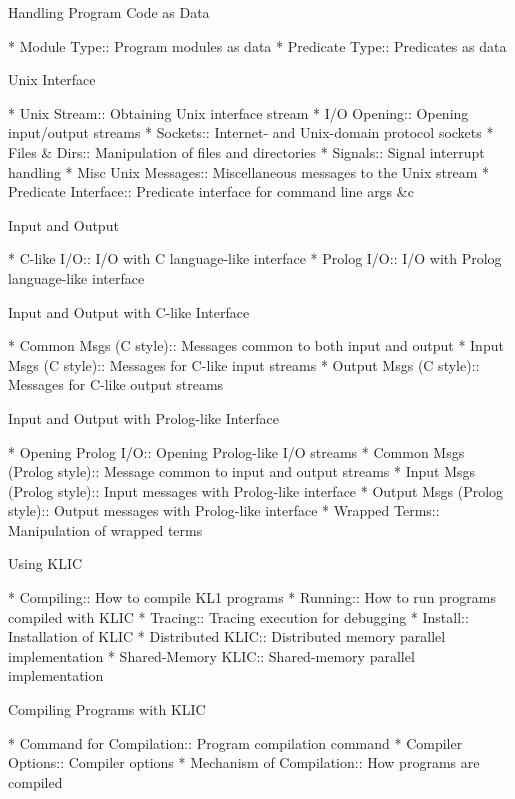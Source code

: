 Handling Program Code as Data

* Module Type::                 Program modules as data
* Predicate Type::              Predicates as data

Unix Interface

* Unix Stream::                 Obtaining Unix interface stream
* I/O Opening::                 Opening input/output streams
* Sockets::                     Internet- and Unix-domain protocol sockets
* Files & Dirs::                Manipulation of files and directories
* Signals::                     Signal interrupt handling
* Misc Unix Messages::          Miscellaneous messages to the Unix stream
* Predicate Interface::         Predicate interface for command line args &c

Input and Output

* C-like I/O::                  I/O with C language-like interface
* Prolog I/O::                  I/O with Prolog language-like interface

Input and Output with C-like Interface

* Common Msgs (C style)::       Messages common to both input and output
* Input Msgs (C style)::        Messages for C-like input streams
* Output Msgs (C style)::       Messages for C-like output streams

Input and Output with Prolog-like Interface

* Opening Prolog I/O::          Opening Prolog-like I/O streams
* Common Msgs (Prolog style)::  Message common to input and output streams
* Input Msgs (Prolog style)::   Input messages with Prolog-like interface
* Output Msgs (Prolog style)::  Output messages with Prolog-like interface
* Wrapped Terms::               Manipulation of wrapped terms

Using KLIC

* Compiling::                   How to compile KL1 programs
* Running::                     How to run programs compiled with KLIC
* Tracing::                     Tracing execution for debugging
* Install::                     Installation of KLIC
* Distributed KLIC::            Distributed memory parallel implementation
* Shared-Memory KLIC::          Shared-memory parallel implementation

Compiling Programs with KLIC

* Command for Compilation::     Program compilation command
* Compiler Options::            Compiler options
* Mechanism of Compilation::    How programs are compiled

